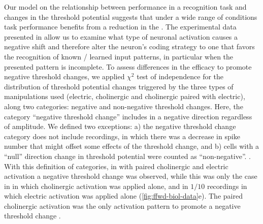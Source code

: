 Our model on the relationship
        between performance in a recognition task and changes in the threshold potential
        suggests that under a wide range of conditions
        task performance benefits from a reduction in the
        .
    The experimental data presented in \cite{Gill2020-wy} allow us to examine
        what type of neuronal activation
        causes a negative  shift
        and therefore alter the neuron's coding strategy to one that favors the recognition of known / learned input patterns,
        in particular when the presented pattern is incomplete.
    To assess differences in the efficacy to promote negative threshold changes,
        we applied $\chi^2$ test of independence
        for the distribution of threshold potential changes
        triggered by the three types of manipulations used (electric, cholinergic and cholinergic paired with electric),
        along two categories: negative and non-negative threshold changes.
    Here, the category ``negative threshold change'' includes
        in a negative direction regardless of amplitude.
    We defined two exceptions:
        a) the negative threshold change category does not include recordings,
            in which there was a decrease in spike number
                that might offset some effects of the threshold change,
        and b) cells with a ``null'' direction change in threshold potential
            were counted as ``non-negative''.
    .
    With this definition of categories,
        in 
            with paired cholinergic and electric activation
            a negative threshold change was observed,
        while this was only the case in
            in which cholinergic activation was applied alone,
        and in $1/10$ recordings in which electric activation was applied alone
        (\autoref{fig:ffwd-biol-data}e).
    The paired cholinergic activation was the only activation pattern
        to promote a  negative threshold change
        .
